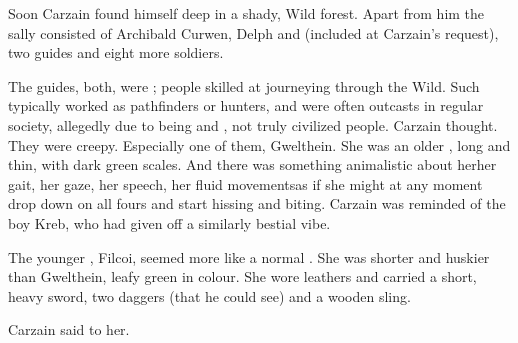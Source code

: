 \new
{}
% 
Soon Carzain found himself deep in a shady, Wild forest. 
Apart from him the sally consisted of Archibald Curwen, Delph and \Tsekkect{} (included at Carzain's request), two guides and eight more soldiers. 

The guides, \sphyles{} both, were \quo{\rangers}; people skilled at journeying through the Wild. 
Such \rangers{} typically worked as pathfinders or hunters, and were often outcasts in regular society, allegedly due to being  and , not truly civilized people. 
 Carzain thought. 
They were creepy. 
Especially one of them, Gwelthein. 
She was an older \sphyle, long and thin, with dark green scales. 
And there was something animalistic about her\dash her gait, her gaze, her speech, her fluid movements\dash as if she might at any moment drop down on all fours and start hissing and biting. 
Carzain was reminded of the boy Kreb, who had given off a similarly bestial vibe. 

The younger \ranger, Filcoi, seemed more like a normal \scatha. 
She was shorter and huskier than Gwelthein, leafy green in colour. 
She wore leathers and carried a short, heavy sword, two daggers (that he could see) and a wooden sling. 

Carzain said to her. 


